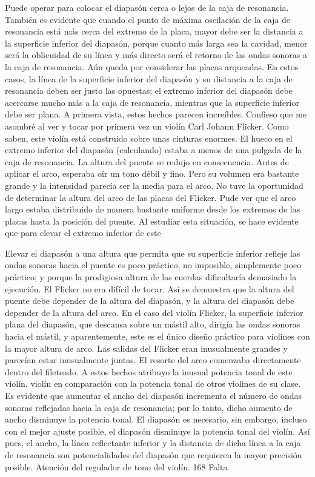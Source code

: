 Puede operar para colocar el diapasón cerca o lejos de la caja de resonancia. También es evidente que cuando el punto de máxima oscilación de la caja de resonancia está más cerca del extremo de la placa, mayor debe ser la distancia a la superficie inferior del diapasón, porque cuanto más larga sea la cavidad, menor será la oblicuidad de su línea y más directo será el retorno de las ondas sonoras a la caja de resonancia.
Aún queda por considerar las placas arqueadas. En estos casos, la línea de la superficie inferior del diapasón y su distancia a la caja de resonancia deben ser justo las opuestas; el extremo inferior del diapasón debe acercarse mucho más a la caja de resonancia, mientras que la superficie inferior debe ser plana. A primera vista, estos hechos parecen increíbles. Confieso que me asombré al ver y tocar por primera vez un violín Carl Johann Flicker. Como saben, este violín está construido sobre unas cinturas enormes. El hueco en el extremo inferior del diapasón (calculando) estaba a menos de una pulgada de la caja de resonancia. La altura del puente se redujo en consecuencia. Antes de aplicar el arco, esperaba oír un tono débil y fino. Pero su volumen era bastante grande y la intensidad parecía ser la media para el arco. No tuve la oportunidad de determinar la altura del arco de las placas del Flicker. Pude ver que el arco largo estaba distribuido de manera bastante uniforme desde los extremos de las placas hasta la posición del puente. Al estudiar esta situación, se hace evidente que para elevar el extremo inferior de este

Elevar el diapasón a una altura que permita que su superficie inferior refleje las ondas sonoras hacia el puente es poco práctico, no imposible, simplemente poco práctico; y porque la prodigiosa altura de las cuerdas dificultaría demasiado la ejecución. El Flicker no era difícil de tocar.
Así se demuestra que la altura del puente debe depender de la altura del diapasón, y la altura del diapasón debe depender de la altura del arco. En el caso del violín Flicker, la superficie inferior plana del diapasón, que descansa sobre un mástil alto, dirigía las ondas sonoras hacia el mástil, y aparentemente, este es el único diseño práctico para violines con la mayor altura de arco. Las salidas del Flicker eran inusualmente grandes y parecían estar inusualmente juntas. El resorte del arco comenzaba directamente dentro del fileteado. A estos hechos atribuyo la inusual potencia tonal de este violín.
violín en comparación con la potencia tonal de otros violines de su clase.
Es evidente que aumentar el ancho del diapasón incrementa el número de ondas sonoras reflejadas hacia la caja de resonancia; por lo tanto, dicho aumento de ancho disminuye la potencia tonal. El diapasón es necesario, sin embargo, incluso con el mejor ajuste posible, el diapasón disminuye la potencia tonal del violín. Así pues, el ancho, la línea reflectante inferior y la distancia de dicha línea a la caja de resonancia son potencialidades del diapasón que requieren la mayor precisión posible.
Atención del regulador de tono del violín. 168	Falta

